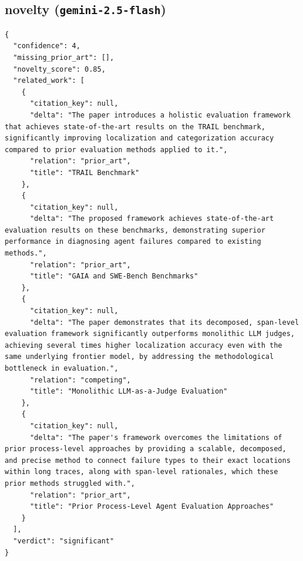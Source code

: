 \documentclass[11pt]{article}
\begin{document}
\subsection*{novelty (\texttt{gemini-2.5-flash})}
\begin{verbatim}
{
  "confidence": 4,
  "missing_prior_art": [],
  "novelty_score": 0.85,
  "related_work": [
    {
      "citation_key": null,
      "delta": "The paper introduces a holistic evaluation framework that achieves state-of-the-art results on the TRAIL benchmark, significantly improving localization and categorization accuracy compared to prior evaluation methods applied to it.",
      "relation": "prior_art",
      "title": "TRAIL Benchmark"
    },
    {
      "citation_key": null,
      "delta": "The proposed framework achieves state-of-the-art evaluation results on these benchmarks, demonstrating superior performance in diagnosing agent failures compared to existing methods.",
      "relation": "prior_art",
      "title": "GAIA and SWE-Bench Benchmarks"
    },
    {
      "citation_key": null,
      "delta": "The paper demonstrates that its decomposed, span-level evaluation framework significantly outperforms monolithic LLM judges, achieving several times higher localization accuracy even with the same underlying frontier model, by addressing the methodological bottleneck in evaluation.",
      "relation": "competing",
      "title": "Monolithic LLM-as-a-Judge Evaluation"
    },
    {
      "citation_key": null,
      "delta": "The paper's framework overcomes the limitations of prior process-level approaches by providing a scalable, decomposed, and precise method to connect failure types to their exact locations within long traces, along with span-level rationales, which these prior methods struggled with.",
      "relation": "prior_art",
      "title": "Prior Process-Level Agent Evaluation Approaches"
    }
  ],
  "verdict": "significant"
}
\end{verbatim}
\end{document}
